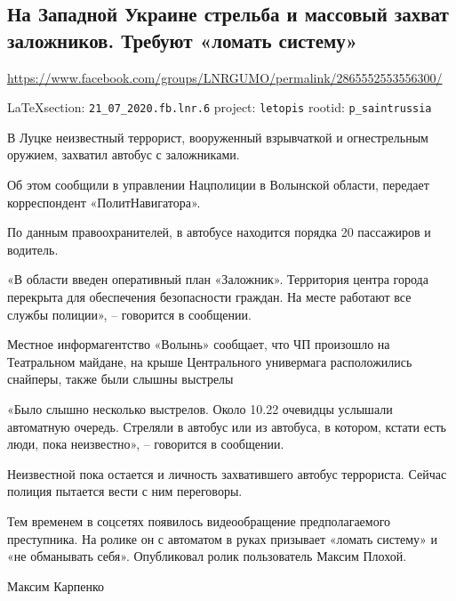  
 
\subsection{На Западной Украине стрельба и массовый захват заложников. Требуют «ломать систему»}
\url{https://www.facebook.com/groups/LNRGUMO/permalink/2865552553556300/}
  
\vspace{0.5cm}
{\small\LaTeX section: \verb|21_07_2020.fb.lnr.6| project: \verb|letopis| rootid: \verb|p_saintrussia|}
\vspace{0.5cm}


В Луцке неизвестный террорист, вооруженный взрывчаткой и огнестрельным оружием,
захватил автобус с заложниками.

Об этом сообщили в управлении Нацполиции в Волынской области, передает
корреспондент «ПолитНавигатора».

По данным правоохранителей, в автобусе находится порядка 20 пассажиров и
водитель.

«В области введен оперативный план «Заложник». Территория центра города
перекрыта для обеспечения безопасности граждан. На месте работают все службы
полиции», – говорится в сообщении.

Местное информагентство «Волынь» сообщает, что ЧП произошло на Театральном
майдане, на крыше Центрального универмага расположились снайперы, также были
слышны выстрелы

«Было слышно несколько выстрелов. Около 10.22 очевидцы услышали автоматную
очередь. Стреляли в автобус или из автобуса, в котором, кстати есть люди, пока
неизвестно», – говорится в сообщении.

Неизвестной пока остается и личность захватившего автобус террориста. Сейчас
полиция пытается вести с ним переговоры.

Тем временем в соцсетях появилось видеообращение предполагаемого преступника.
На ролике он с автоматом в руках призывает «ломать систему» и «не обманывать
себя». Опубликовал ролик пользователь Максим Плохой.

Максим Карпенко
  

